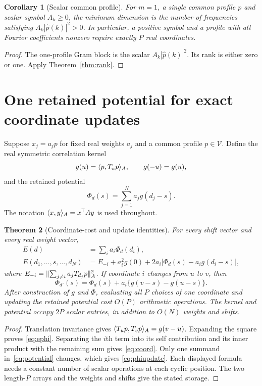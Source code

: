 \documentclass[11pt,a4paper]{article}
\newtheorem{theorem}{Theorem}\newtheorem{proposition}[theorem]{Proposition}\newtheorem{lemma}[theorem]{Lemma}\newtheorem{corollary}[theorem]{Corollary}\theoremstyle{definition}\newtheorem{definition}[theorem]{Definition}\newtheorem{example}[theorem]{Example}
\begin{document}
\begin{corollary}[Scalar common profile]\label{cor:scalar}
For $m=1$, a single common profile $p$ and scalar symbol $A_k\ge0$, the
minimum dimension is the number of frequencies satisfying
$A_k|\widehat p(k)|^2>0$. In particular, a positive symbol and a profile
with all Fourier coefficients nonzero require exactly $P$ real coordinates.
\end{corollary}
\begin{proof}
The one-profile Gram block is the scalar $A_k|\widehat p(k)|^2$.
Its rank is either zero or one. Apply Theorem~\ref{thm:rank}.
\end{proof}

\section{One retained potential for exact coordinate updates}
Suppose $x_j=a_jp$ for fixed real weights $a_j$ and a common profile
$p\in\mathcal V$. Define the real symmetric correlation kernel
\begin{equation}\label{eq:kernel}
 g(u)=\langle p,T_up\rangle_A,
 \qquad g(-u)=g(u),
\end{equation}
and the retained potential
\begin{equation}\label{eq:potential}
 \Phi_d(s)=\sum_{j=1}^N a_jg(d_j-s).
\end{equation}
The notation $\langle x,y\rangle_A=x^\mathsf T A y$ is used throughout.

\begin{theorem}[Coordinate-cost and update identities]\label{thm:update}
For every shift vector and every real weight vector,
\begin{align}
 E(d)&=\sum_i a_i\Phi_d(d_i),\label{eq:ephi}\\
 E(d_1,\ldots,s,\ldots,d_N)
 &=E_{-i}+a_i^2g(0)+2a_i\bigl[\Phi_d(s)-a_i g(d_i-s)\bigr],\label{eq:coord}
\end{align}
where $E_{-i}=\lVert \sum_{j\ne i}a_jT_{d_j}p\rVert_A^2$.
If coordinate $i$ changes from $u$ to $v$, then
\begin{equation}\label{eq:phiupdate}
 \Phi_{d'}(s)=\Phi_d(s)+a_i\{g(v-s)-g(u-s)\}.
\end{equation}
After construction of $g$ and $\Phi$, evaluating all $P$ choices of one
coordinate and updating the retained potential cost $O(P)$ arithmetic
operations. The kernel and potential occupy $2P$ scalar entries, in
addition to $O(N)$ weights and shifts.
\end{theorem}
\begin{proof}
Translation invariance gives
$\langle T_up,T_vp\rangle_A=g(v-u)$. Expanding the square proves
\eqref{eq:ephi}. Separating the $i$th term into its self contribution and
its inner product with the remaining sum gives~\eqref{eq:coord}.
Only one summand in~\eqref{eq:potential} changes, which gives
\eqref{eq:phiupdate}. Each displayed formula needs a constant number of
scalar operations at each cyclic position. The two length-$P$ arrays
and the weights and shifts give the stated storage.
\end{proof}
\end{document}
